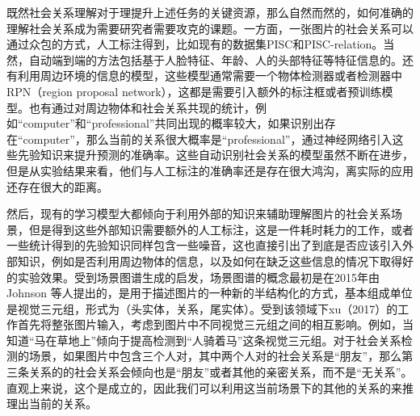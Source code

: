 既然社会关系理解对于理提升上述任务的关键资源，那么自然而然的，如何准确的理解社会关系成为需要研究者需要攻克的课题。一方面，一张图片的社会关系可以通过众包的方式，人工标注得到，比如现有的数据集PISC\cite{li2017dual-glance}和PISC-relation\cite{sun2017a}。当然，自动端到端的方法包括基于人脸特征、年龄、人的头部特征等特征信息的\cite{sun2017a,zhang2015learning}。还有利用周边环境的信息的模型\cite{li2017dual-glance,wang2018deep}，这些模型通常需要一个物体检测器或者检测器中RPN（region proposal network），这都是需要引入额外的标注框或者预训练模型。也有通过对周边物体和社会关系共现的统计，例如``computer''和``professional''共同出现的概率较大，如果识别出存在``computer''，那么当前的关系很大概率是``professional''，通过神经网络引入这些先验知识来提升预测的准确率。这些自动识别社会关系的模型虽然不断在进步，但是从实验结果来看，他们与人工标注的准确率还是存在很大鸿沟，离实际的应用还存在很大的距离。

然后，现有的学习模型大都倾向于利用外部的知识来辅助理解图片的社会关系场景，但是得到这些外部知识需要额外的人工标注，这是一件耗时耗力的工作，或者一些统计得到的先验知识同样包含一些噪音，这也直接引出了到底是否应该引入外部知识，例如是否利用周边物体的信息，以及如何在缺乏这些信息的情况下取得好的实验效果。受到场景图谱生成的启发，场景图谱的概念最初是在2015年由Johnson 等人\cite{johnson2015image}提出的，是用于描述图片的一种新的半结构化的方式，基本组成单位是视觉三元组，形式为（头实体，关系，尾实体）。受到该领域下xu（2017）\cite{xu2017scene}的工作首先将整张图片输入，考虑到图片中不同视觉三元组之间的相互影响。例如，当知道``马在草地上''倾向于提高检测到``人骑着马''这条视觉三元组。对于社会关系检测的场景，如果图片中包含三个人对，其中两个人对的社会关系是``朋友''，那么第三条关系的的社会关系会倾向也是``朋友''或者其他的亲密关系，而不是``无关系''。直观上来说，这个是成立的，因此我们可以利用这当前场景下的其他的关系的来推理出当前的关系。

